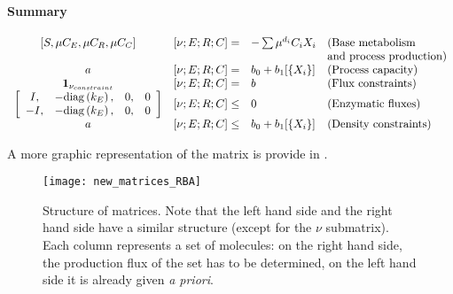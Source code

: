\paragraph{Summary}

\[
\begin{array}{ccll}
  [S, \mu C_E, \mu C_R, \mu C_C] & [\nu;E;R;C] = & 
  - \sum \mu^{d_i}C_i X_i & \textrm{(Base metabolism}\\
  & & & \textrm{and process production)} \\
  a & [\nu; E; R; C] = & b_0 + b_1 [\{X_i\}] & \textrm{(Process capacity)}\\
  \mathbf{1}_{\nu_{constraint}} & [\nu; E; R; C] = & b & \textrm{(Flux constraints)} \\
  \left[
    \begin{array}{cccc}
      I, & -\mathrm{diag}\left(k_E\right), & 0, & 0 \\
      -I, & -\mathrm{diag}\left(k_E\right), & 0, & 0
    \end{array}
    \right] & [\nu; E;R;C] \leq & 0 & \textrm{(Enzymatic fluxes)}\\
  a & [\nu; E; R; C] \leq & b_0 + b_1 [\{X_i\}] & \textrm{(Density constraints)} \\
\end{array}	
\]

A more graphic representation of the matrix is provide in .

\begin{figure}[ht]
  \centering
  \texttt{[image: new\_matrices\_RBA]}
  \caption{Structure of matrices. Note that the left hand side and the right hand side have a similar structure (except for the $\nu$ submatrix). Each column represents a set of molecules: on the right hand side, the production flux of the set has to be determined, on the left hand side it is already given \textit{a priori}.}
  \label{fig:new_matrices_rba}
\end{figure}
